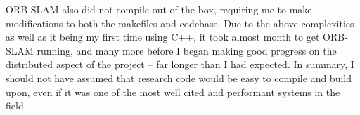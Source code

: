 ORB-SLAM also did not compile out-of-the-box, requiring me to make modifications to both the makefiles and codebase. Due to the above complexities as well as it being my first time using C++, it took almost month to get ORB-SLAM running, and many more before I began making good progress on the distributed aspect of the project – far longer than I had expected. In summary, I should not have assumed that research code would be easy to compile and build upon, even if it was one of the most well cited and performant systems in the field. %




